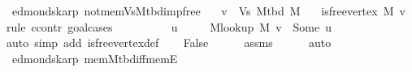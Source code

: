 \begin{isabellebody}
\isamarkupfalse%
%
\endisatagproof
{\isafoldproof}%
%
\isadelimproof
\isanewline
%
\endisadelimproof
%
\isadeliminvisible
\isanewline
%
\endisadeliminvisible
%
\isataginvisible
{}\isamarkupfalse%
\ {\isacharparenleft}{\kern0pt}\ edmonds{\isacharunderscore}{\kern0pt}karp{\isacharparenright}{\kern0pt}\ not{\isacharunderscore}{\kern0pt}mem{\isacharunderscore}{\kern0pt}Vs{\isacharunderscore}{\kern0pt}M{\isacharunderscore}{\kern0pt}tbd{\isacharunderscore}{\kern0pt}imp{\isacharunderscore}{\kern0pt}free{\isacharcolon}{\kern0pt}\isanewline
\ \ \ {\isachardoublequoteopen}v\ {\isasymnotin}\ Vs\ {\isacharparenleft}{\kern0pt}M{\isacharunderscore}{\kern0pt}tbd\ M{\isacharparenright}{\kern0pt}{\isachardoublequoteclose}\isanewline
\ \ \ {\isachardoublequoteopen}is{\isacharunderscore}{\kern0pt}free{\isacharunderscore}{\kern0pt}vertex\ M\ v{\isachardoublequoteclose}%
\endisataginvisible
{\isafoldinvisible}%
%
\isadeliminvisible
\isanewline
%
\endisadeliminvisible
%
\isadelimproof
%
\endisadelimproof
%
\isatagproof
{}\isamarkupfalse%
\ {\isacharparenleft}{\kern0pt}rule\ ccontr{\isacharcomma}{\kern0pt}\ goal{\isacharunderscore}{\kern0pt}cases{\isacharparenright}{\kern0pt}\isanewline
\ \ \isamarkupfalse%
\ {}\isanewline
\ \ \isamarkupfalse%
\ \isamarkupfalse%
\ u\ \isanewline
\ \ \ \ {\isachardoublequoteopen}M{\isacharunderscore}{\kern0pt}lookup\ M\ v\ {\isacharequal}{\kern0pt}\ Some\ u{\isachardoublequoteclose}\isanewline
\ \ \ \ \isamarkupfalse%
\ {\isacharparenleft}{\kern0pt}auto\ simp\ add{\isacharcolon}{\kern0pt}\ is{\isacharunderscore}{\kern0pt}free{\isacharunderscore}{\kern0pt}vertex{\isacharunderscore}{\kern0pt}def{\isacharparenright}{\kern0pt}\isanewline
\ \ \isamarkupfalse%
\ False\isanewline
\ \ \ \ \isamarkupfalse%
\ assms\isanewline
\ \ \ \ \isamarkupfalse%
\ auto\isanewline
{}\isamarkupfalse%
%
\endisatagproof
{\isafoldproof}%
%
\isadelimproof
\isanewline
%
\endisadelimproof
%
\isadeliminvisible
\isanewline
%
\endisadeliminvisible
%
\isataginvisible
{}\isamarkupfalse%
\ {\isacharparenleft}{\kern0pt}\ edmonds{\isacharunderscore}{\kern0pt}karp{\isacharparenright}{\kern0pt}\ mem{\isacharunderscore}{\kern0pt}M{\isacharunderscore}{\kern0pt}tbd{\isacharunderscore}{\kern0pt}iff{\isacharunderscore}{\kern0pt}mem{\isacharunderscore}{\kern0pt}E{}{\isacharcolon}{\kern0pt}\isanewline

\end{isabellebody}
